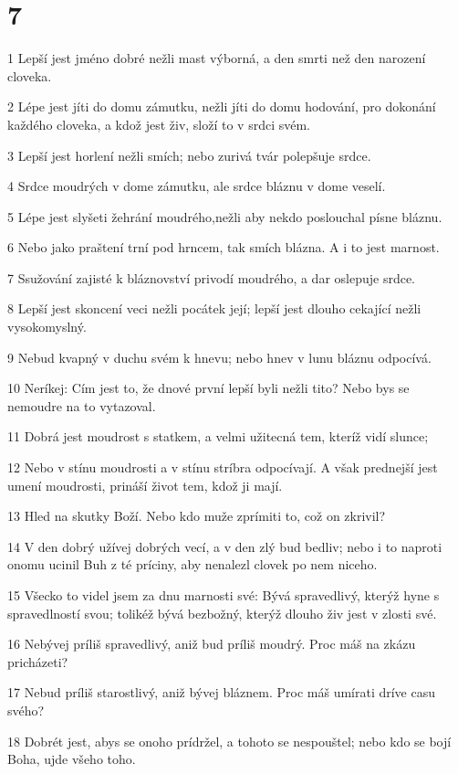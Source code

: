 \chapter{7}

\par 1 Lepší jest jméno dobré nežli mast výborná, a den smrti než den narození cloveka.
\par 2 Lépe jest jíti do domu zámutku, nežli jíti do domu hodování, pro dokonání každého cloveka, a kdož jest živ, složí to v srdci svém.
\par 3 Lepší jest horlení nežli smích; nebo zurivá tvár polepšuje srdce.
\par 4 Srdce moudrých v dome zámutku, ale srdce bláznu v dome veselí.
\par 5 Lépe jest slyšeti žehrání moudrého,nežli aby nekdo poslouchal písne bláznu.
\par 6 Nebo jako praštení trní pod hrncem, tak smích blázna. A i to jest marnost.
\par 7 Ssužování zajisté k bláznovství privodí moudrého, a dar oslepuje srdce.
\par 8 Lepší jest skoncení veci nežli pocátek její; lepší jest dlouho cekající nežli vysokomyslný.
\par 9 Nebud kvapný v duchu svém k hnevu; nebo hnev v lunu bláznu odpocívá.
\par 10 Neríkej: Cím jest to, že dnové první lepší byli nežli tito? Nebo bys se nemoudre na to vytazoval.
\par 11 Dobrá jest moudrost s statkem, a velmi užitecná tem, kteríž vidí slunce;
\par 12 Nebo v stínu moudrosti a v stínu stríbra odpocívají. A však prednejší jest umení moudrosti, prináší život tem, kdož ji mají.
\par 13 Hled na skutky Boží. Nebo kdo muže zprímiti to, což on zkrivil?
\par 14 V den dobrý užívej dobrých vecí, a v den zlý bud bedliv; nebo i to naproti onomu ucinil Buh z té príciny, aby nenalezl clovek po nem niceho.
\par 15 Všecko to videl jsem za dnu marnosti své: Bývá spravedlivý, kterýž hyne s spravedlností svou; tolikéž bývá bezbožný, kterýž dlouho živ jest v zlosti své.
\par 16 Nebývej príliš spravedlivý, aniž bud príliš moudrý. Proc máš na zkázu pricházeti?
\par 17 Nebud príliš starostlivý, aniž bývej bláznem. Proc máš umírati dríve casu svého?
\par 18 Dobrét jest, abys se onoho prídržel, a tohoto se nespouštel; nebo kdo se bojí Boha, ujde všeho toho.
